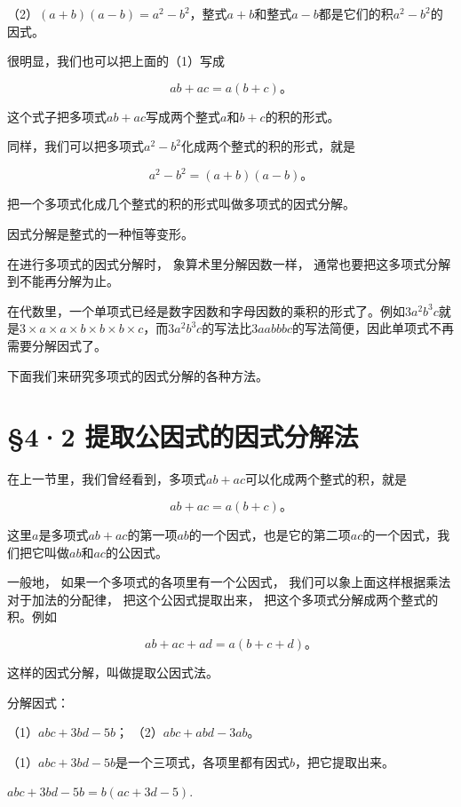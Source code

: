 （2）\((a + b)(a - b) = a^2 - b^2\)，整式\(a + b\)和整式\(a - b\)都是它们的积\(a^2 - b^2\)的因式。

很明显，我们也可以把上面的（1）写成

\[
a b + a c = a (b + c)\text{。}
\]

这个式子把多项式\(ab + ac\)写成两个整式\(a\)和\(b + c\)的积的形式。

同样，我们可以把多项式\(a^2 - b^2\)化成两个整式的积的形式，就是

\[
a ^{2} - b ^{2} = (a + b) (a - b)\text{。}
\]

把一个多项式化成几个整式的积的形式叫做多项式的因式分解。

因式分解是整式的一种恒等变形。

在进行多项式的因式分解时， 象算术里分解因数一样，
通常也要把这多项式分解到不能再分解为止。


在代数里，一个单项式已经是数字因数和字母因数的乘积的形式了。例如\(3a^{2}b^{3}c\)就是\(3 \times a \times a \times b \times b \times b \times c\)，而\(3a^{2}b^{3}c\)的写法比\(3aabbbc\)的写法简便，因此单项式不再需要分解因式了。

下面我们来研究多项式的因式分解的各种方法。

\section{§4·2 提取公因式的因式分解法}

在上一节里，我们曾经看到，多项式\(ab + ac\)可以化成两个整式的积，就是

\[
a b + a c = a (b + c)\text{。}
\]

这里\(a\)是多项式\(ab + ac\)的第一项\(ab\)的一个因式，也是它的第二项\(ac\)的一个因式，我们把它叫做\(ab\)和\(ac\)的公因式。

一般地， 如果一个多项式的各项里有一个公因式，
我们可以象上面这样根据乘法对于加法的分配律， 把这个公因式提取出来，
把这个多项式分解成两个整式的积。例如

\[
a b + a c + a d = a (b + c + d)\text{。}
\]

这样的因式分解，叫做提取公因式法。

 分解因式：

（1）\(abc + 3bd - 5b\)； （2）\(abc + abd - 3ab\)。

（1）\(abc + 3bd - 5b\)是一个三项式，各项里都有因式\(b\)，把它提取出来。

\(abc + 3bd - 5b = b(ac + 3d - 5).\)

